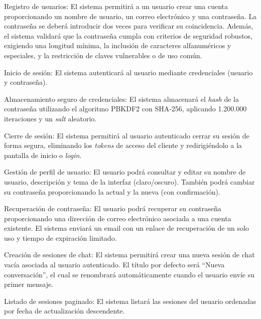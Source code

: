 \begin{functional}
    \item Registro de usuarios: El sistema permitirá a un usuario crear una cuenta proporcionando un nombre de usuario, un correo electrónico y una contraseña. La contraseña se deberá introducir dos veces para verificar su coincidencia. Además, el sistema validará que la contraseña cumpla con criterios de seguridad robustos, exigiendo una longitud mínima, la inclusión de caracteres alfanuméricos y especiales, y la restricción de claves vulnerables o de uso común.

    \item Inicio de sesión: El sistema autenticará al usuario mediante credenciales (usuario y contraseña).

    \item Almacenamiento seguro de credenciales: El sistema almacenará el \textit{hash} de la contraseña utilizando el algoritmo PBKDF2 con SHA-256, aplicando 1.200.000 iteraciones y un \textit{salt} aleatorio.

    \item Cierre de sesión: El sistema permitirá al usuario autenticado cerrar su sesión de forma segura, eliminando los \textit{tokens} de acceso del cliente y redirigiéndolo a la pantalla de inicio o \textit{login}.

    \item Gestión de perfil de usuario: El usuario podrá consultar y editar su nombre de usuario, descripción y tema de la interfaz (claro/oscuro). También podrá cambiar su contraseña proporcionando la actual y la nueva (con confirmación).

    \item Recuperación de contraseña: El usuario podrá recuperar su contraseña proporcionando una dirección de correo electrónico asociada a una cuenta existente. El sistema enviará un email con un enlace de recuperación de un solo uso y tiempo de expiración limitado.

    \item Creación de sesiones de chat: El sistema permitirá crear una nueva sesión de chat vacía asociada al usuario autenticado. El título por defecto será ``Nueva conversación'', el cual se renombrará automáticamente cuando el usuario envíe su primer mensaje.

    \item Listado de sesiones paginado: El sistema listará las sesiones del usuario ordenadas por fecha de actualización descendente.


\end{functional}
